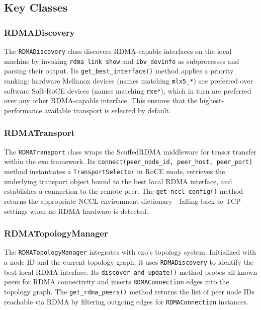 \documentclass[10pt,letterpaper]{article}
\begin{document}
\subsection{Key Classes}

\subsubsection{RDMADiscovery}

The \texttt{RDMADiscovery} class discovers RDMA-capable interfaces on the local machine by invoking \texttt{rdma link show} and \texttt{ibv\_devinfo} as subprocesses and parsing their output. Its \texttt{get\_best\_interface()} method applies a priority ranking: hardware Mellanox devices (names matching \texttt{mlx5\_*}) are preferred over software Soft-RoCE devices (names matching \texttt{rxe*}), which in turn are preferred over any other RDMA-capable interface. This ensures that the highest-performance available transport is selected by default.

\subsubsection{RDMATransport}

The \texttt{RDMATransport} class wraps the ScuffedRDMA middleware for tensor transfer within the exo framework. Its \texttt{connect(peer\_node\_id, peer\_host, peer\_port)} method instantiates a \texttt{TransportSelector} in RoCE mode, retrieves the underlying transport object bound to the best local RDMA interface, and establishes a connection to the remote peer. The \texttt{get\_nccl\_config()} method returns the appropriate NCCL environment dictionary---falling back to TCP settings when no RDMA hardware is detected.

\subsubsection{RDMATopologyManager}

The \texttt{RDMATopologyManager} integrates with exo's topology system. Initialized with a node ID and the current topology graph, it uses \texttt{RDMADiscovery} to identify the best local RDMA interface. Its \texttt{discover\_and\_update()} method probes all known peers for RDMA connectivity and inserts \texttt{RDMAConnection} edges into the topology graph. The \texttt{get\_rdma\_peers()} method returns the list of peer node IDs reachable via RDMA by filtering outgoing edges for \texttt{RDMAConnection} instances.
\end{document}

